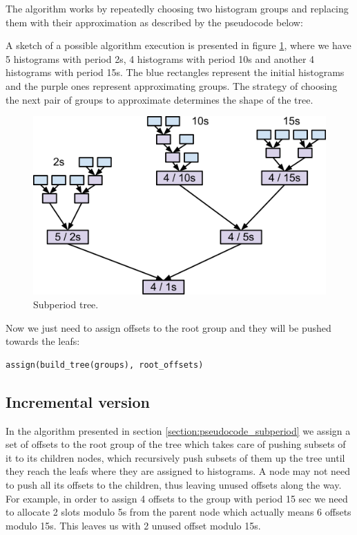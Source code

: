 The algorithm works by repeatedly choosing two histogram groups and replacing them with their approximation as described by the pseudocode below:

A sketch of a possible algorithm execution is presented in figure \ref{fig:subperiod_tree}, where we have 5 histograms with period 2s, 4 histograms with period 10s and another 4 histograms with period 15s. The blue rectangles represent the initial histograms and the purple ones represent approximating groups. The strategy of choosing the next pair of groups to approximate determines the shape of the tree.
\begin{figure}[ht!]
\centering
\includegraphics[scale=0.7]{Images/subperiod_tree.png}
\caption{Subperiod tree.}
\label{fig:subperiod_tree}
\end{figure}

Now we just need to assign offsets to the root group and they will be pushed towards the leafs:
\begin{verbatim}
assign(build_tree(groups), root_offsets)
\end{verbatim}

\subsection{Incremental version}

In the algorithm presented in section \ref{section:pseudocode_subperiod} we assign a set of offsets to the root group of the tree which takes care of pushing subsets of it to its children nodes, which recursively push subsets of them up the tree until they reach the leafs where they are assigned to histograms. A node may not need to push all its offsets to the children, thus leaving unused offsets along the way. For example, in order to assign 4 offsets to the group with period 15 sec we need to allocate 2 slots modulo 5s from the parent node which actually means 6 offsets modulo 15s. This leaves us with 2 unused offset modulo 15s.

